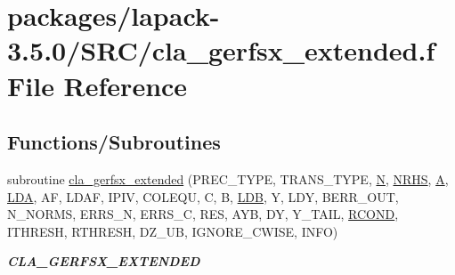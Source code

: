 \hypertarget{cla__gerfsx__extended_8f}{}\section{packages/lapack-\/3.5.0/\+S\+R\+C/cla\+\_\+gerfsx\+\_\+extended.f File Reference}
\label{cla__gerfsx__extended_8f}
\subsection*{Functions/\+Subroutines}
\begin{DoxyCompactItemize}
\item 
subroutine \hyperlink{group__complexGEcomputational_ga929fb2d32408f812f7fd624706ba0af4}{cla\+\_\+gerfsx\+\_\+extended} (P\+R\+E\+C\+\_\+\+T\+Y\+P\+E, T\+R\+A\+N\+S\+\_\+\+T\+Y\+P\+E, \hyperlink{polmisc_8c_a0240ac851181b84ac374872dc5434ee4}{N}, \hyperlink{example__user_8c_aa0138da002ce2a90360df2f521eb3198}{N\+R\+H\+S}, \hyperlink{classA}{A}, \hyperlink{example__user_8c_ae946da542ce0db94dced19b2ecefd1aa}{L\+D\+A}, A\+F, L\+D\+A\+F, I\+P\+I\+V, C\+O\+L\+E\+Q\+U, C, B, \hyperlink{example__user_8c_a50e90a7104df172b5a89a06c47fcca04}{L\+D\+B}, Y, L\+D\+Y, B\+E\+R\+R\+\_\+\+O\+U\+T, N\+\_\+\+N\+O\+R\+M\+S, E\+R\+R\+S\+\_\+\+N, E\+R\+R\+S\+\_\+\+C, R\+E\+S, A\+Y\+B, D\+Y, Y\+\_\+\+T\+A\+I\+L, \hyperlink{superlu__enum__consts_8h_af00a42ecad444bbda75cde1b64bd7e72a9b5c151728d8512307565994c89919d5}{R\+C\+O\+N\+D}, I\+T\+H\+R\+E\+S\+H, R\+T\+H\+R\+E\+S\+H, D\+Z\+\_\+\+U\+B, I\+G\+N\+O\+R\+E\+\_\+\+C\+W\+I\+S\+E, I\+N\+F\+O)
\begin{DoxyCompactList}\small\item\em {\bfseries C\+L\+A\+\_\+\+G\+E\+R\+F\+S\+X\+\_\+\+E\+X\+T\+E\+N\+D\+E\+D} \end{DoxyCompactList}\end{DoxyCompactItemize}
